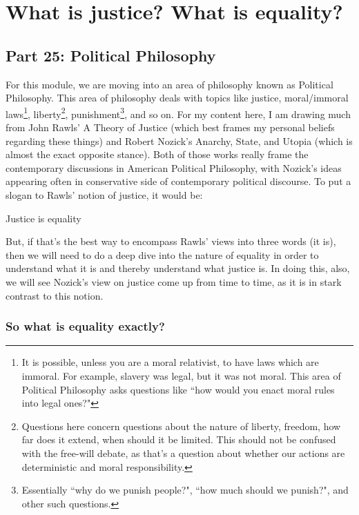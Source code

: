 \part{What is justice? What is equality?}
\label{ch.modeleven}
\chapter{Part 25: Political Philosophy}


For this module, we are moving into an area of philosophy known as Political Philosophy. This area of philosophy deals with topics like justice, moral/immoral laws\footnote{It is possible, unless you are a moral relativist, to have laws which are immoral. For example, slavery was legal, but it was not moral. This area of Political Philosophy asks questions like ``how would you enact moral rules into legal ones?"}, liberty\footnote{Questions here concern questions about the nature of liberty, freedom, how far does it extend, when should it be limited. This should not be confused with the free-will debate, as that's a question about whether our actions are deterministic and moral responsibility.}, punishment\footnote{Essentially ``why do we punish people?", ``how much should we punish?", and other such questions.}, and so on. For my content here, I am drawing much from John Rawls' A Theory of Justice (which best frames my personal beliefs regarding these things) and Robert Nozick's Anarchy, State, and Utopia (which is almost the exact opposite stance). Both of those works really frame the contemporary discussions in American Political Philosophy, with Nozick's ideas appearing often in conservative side of contemporary political discourse. To put a slogan to Rawls' notion of justice, it would be:
\begin{center}
Justice is equality
\end{center}
But, if that's the best way to encompass Rawls' views into three words (it is), then we will need to do a deep dive into the nature of equality in order to understand what it is and thereby understand what justice is. In doing this, also, we will see Nozick's view on justice come up from time to time, as it is in stark contrast to this notion.
\section{So what is equality exactly?}

